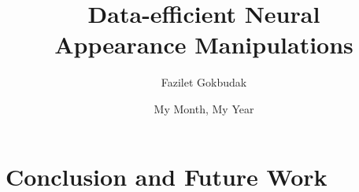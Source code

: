 \documentclass[withindex, glossary]{cam-thesis}
\title{Data-efficient Neural\\
Appearance Manipulations}
\author{Fazilet Gokbudak}
\date{My Month, My Year}
\begin{document}
\frontmatter{}












\chapter{Conclusion and Future Work}


\cleardoublepage
{}
{}






\appendix









\printthesisindex
\end{document}
